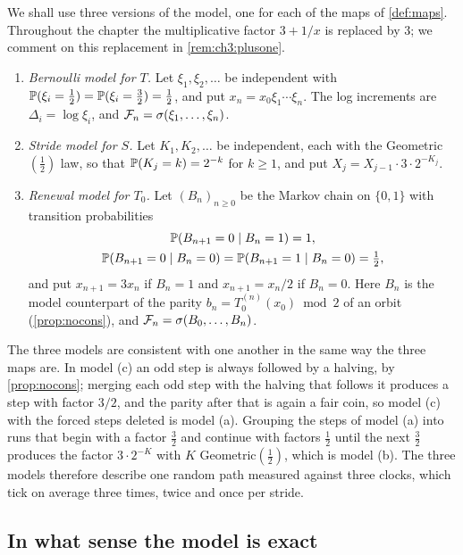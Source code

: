 We shall use three versions of the model, one for each of the maps of
\cref{def:maps}. Throughout the chapter the multiplicative factor $3+1/x$ is
replaced by $3$; we comment on this replacement in
\cref{rem:ch3:plusone}.

\begin{definition}\label{def:ch3:models}
\leavevmode
\begin{enumerate}[label=(\alph*),leftmargin=2em]
\item \emph{Bernoulli model for $T$.} Let $\xi_1,\xi_2,\ldots$ be independent
  with $\mathbb{P}(\xi_i=\tfrac12)=\mathbb{P}(\xi_i=\tfrac32)=\tfrac12$, and put
  $x_n=x_0\xi_1\cdots\xi_n$. The log increments are $\Delta_i=\log\xi_i$, and
  $\mathcal{F}_n=\sigma(\xi_1,\ldots,\xi_n)$.
\item \emph{Stride model for $S$.} Let $K_1,K_2,\ldots$ be independent,
  each with the Geometric$(\tfrac12)$ law, so that $\mathbb{P}(K_j=k)=2^{-k}$ for
  $k\geq1$, and put $X_j=X_{j-1}\cdot3\cdot2^{-K_j}$.
\item \emph{Renewal model for $T_0$.} Let $(B_n)_{n\geq0}$ be the Markov chain
  on $\{0,1\}$ with transition probabilities
  \begin{gather*}
    \mathbb{P}(B_{n+1}=0\mid B_n=1)=1,\\
    \mathbb{P}(B_{n+1}=0\mid B_n=0)=\mathbb{P}(B_{n+1}=1\mid B_n=0)=\tfrac12,
  \end{gather*}
  and put $x_{n+1}=3x_n$ if $B_n=1$ and $x_{n+1}=x_n/2$ if $B_n=0$. Here
  $B_n$ is the model counterpart of the parity $b_n=T_0^{(n)}(x_0)\bmod2$ of an
  orbit (\cref{prop:nocons}), and $\mathcal{F}_n=\sigma(B_0,\ldots,B_n)$.
\end{enumerate}
\end{definition}

The three models are consistent with one another in the same way the three maps
are. In model (c) an odd step is always followed by a halving, by
\cref{prop:nocons}; merging each odd step with the halving that follows it
produces a step with factor $3/2$, and the parity after that is again a fair
coin, so model (c) with the forced steps deleted is model (a). Grouping the
steps of model (a) into runs that begin with a factor $\tfrac32$ and continue
with factors $\tfrac12$ until the next $\tfrac32$ produces the factor
$3\cdot2^{-K}$ with $K$ Geometric$(\tfrac12)$, which is model (b). The three
models therefore describe one random path measured against three clocks, which
tick on average three times, twice and once per stride.

\subsection{In what sense the model is exact}

